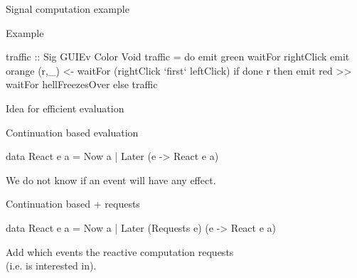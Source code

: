 \documentclass{beamer}
\begin{document}
\begin{frame}{Signal computation example}

\begin{block}{Example}
\vspace{-0.4cm}
\begin{center}
\end{center}
\vspace{-0.6cm}
\begin{code}
traffic :: Sig GUIEv Color Void
traffic = 
  do  emit green 
      waitFor rightClick
      emit orange
      (r,_) <- waitFor (rightClick `first` leftClick)
      if done r 
      then  emit red >> waitFor hellFreezesOver 
      else  traffic
\end{code}
\setlength{\mathindent}{\tmathindenta}
\vspace{-0.8cm}
\end{block}
\end{frame}

\begin{frame}{Idea for efficient evaluation}

\begin{block}{Continuation based evaluation}

\begin{code}
data React e a = Now a | Later (e -> React e a) 
\end{code}
We do not know if an event will have any effect.
\end{block}

\begin{block}{Continuation based + requests}
\begin{code}
data React e a = Now a | Later (Requests e) (e -> React e a) 
\end{code}
Add which events the reactive computation \alert{requests}\\ (i.e. is interested in).
\end{block}
\end{frame}
\end{document}
